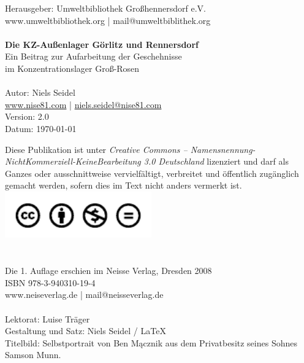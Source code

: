 \documentclass[a4paper,12pt,ngerman,
]{nisebook}
\begin{document}
\small{
Herausgeber: Umweltbibliothek Großhennersdorf e.V.\\
www.umweltbibliothek.org | mail@umweltbiblithek.org
\\ \\
\textbf{Die KZ-Außenlager Görlitz und Rennersdorf}\\
Ein Beitrag zur Aufarbeitung der Geschehnisse\\ im Konzentrationslager Groß-Rosen
\\ \\
Autor: Niels Seidel\\
\href{http://www.nise81.com}{www.nise81.com} | \href{mailto:niels.seidel@nise81.com}{niels.seidel@nise81.com}\\
Version: 2.0\\
Datum: \today\\

\vspace{2.5cm}


Diese Publikation ist unter \emph{Creative Commons -- Namensnennung-NichtKommerziell-KeineBearbeitung 3.0 Deutschland} lizenziert und darf als Ganzes oder ausschnittweise vervielfältigt, verbreitet und öffentlich zugänglich gemacht werden, sofern dies im Text nicht anders vermerkt ist.\newline\vspace{10pt}
\includegraphics[height=20mm]{images/logo_cc.pdf}
\\ \\ \\


Die 1. Auflage erschien im Neisse Verlag, Dresden 2008\\
ISBN 978-3-940310-19-4\\
www.neiseverlag.de | mail@neisseverlag.de\\ \\

Lektorat: Luise Träger\\
Gestaltung und Satz: Niels Seidel / \LaTeX\\
Titelbild: Selbstportrait von Ben Mącznik aus dem Privatbesitz seines Sohnes Samson Munn.\\ \\


}
\normalsize
\newpage
\pagestyle{plain}
\setcounter{page}{5}
\tableofcontents
\newpage
\end{document}
